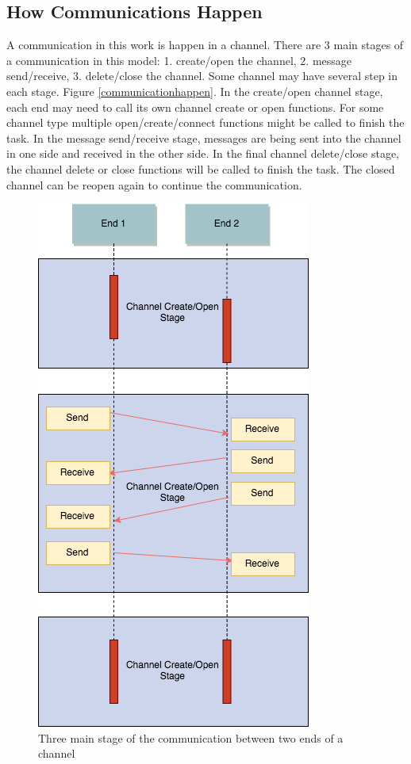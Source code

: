 \subsection{How Communications Happen}   
A communication in this work is happen in a channel. There are 3 main stages of a communication in this model: 1. create/open the channel, 2. message send/receive, 3. delete/close the channel. Some channel may have several step in each stage. Figure \ref{communicationhappen}. In the create/open channel stage, each end may need to call its own channel create or open functions. For some channel type multiple open/create/connect functions might be called to finish the task. In the message send/receive stage, messages are being sent into the channel in one side and received in the other side. In the final channel delete/close stage, the channel delete or close functions will be called to finish the task. The closed channel can be reopen again to continue the communication.
\begin{figure}[h]
\centerline{\includegraphics[scale=0.5]{Figures/communicationhappen}}
 \caption{Three main stage of the communication between two ends of a channel}
\label{event}
\end{figure}

